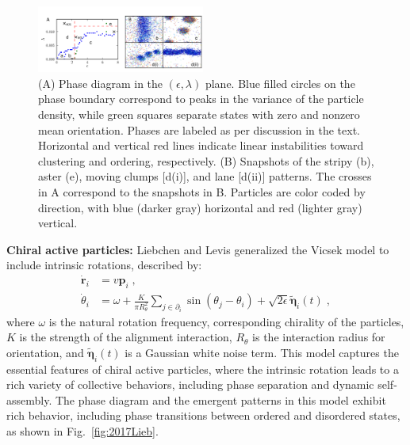 \documentclass[a4paper, amsfonts, amssymb, amsmath, reprint, showkeys, showpacs, nofootinbib, twoside]{revtex4-2}
\begin{document}
\begin{figure}
    \includegraphics[width=0.49\textwidth]{./figs/Farrell.png}
    \caption{
        \label{fig:ferrellSnapshots}
        (A) Phase diagram in the $(\epsilon, \lambda)$ plane. Blue filled circles on the phase boundary correspond to peaks in the variance of the particle density, while green squares separate states with zero and nonzero mean orientation. Phases are labeled as per discussion in the text. Horizontal and vertical red lines indicate linear instabilities toward clustering and ordering, respectively.
        (B) Snapshots of the stripy (b), aster (e), moving clumps [d(i)], and lane [d(ii)] patterns. The crosses in A correspond to the snapshots in B. Particles are color coded by direction, with blue (darker gray) horizontal and red (lighter gray) vertical.
    }
\end{figure}

\textbf{Chiral active particles:} Liebchen and Levis \cite{PhysRevLett.119.058002} generalized the Vicsek model to include intrinsic rotations, described by:
\begin{subequations}
    \label{eq:chiralActiveParticles}
    \begin{align}
        \dot{\mathbf{r}}_i&=v\mathbf{p}_i \;,
        \\
        \dot{\theta}_i&=\omega +\frac{K}{\pi R_{\theta}^{2}}\sum_{j\in \partial _i}{\sin \left( \theta _j-\theta _i \right)}+\sqrt{2\epsilon}\tilde{\boldsymbol{\eta}}_i\left( t \right) \;,
    \end{align}
\end{subequations}
where $\omega$ is the natural rotation frequency, corresponding chirality of the particles, $K$ is the strength of the alignment interaction, $R_{\theta}$ is the interaction radius for orientation, and $\tilde{\boldsymbol{\eta}}_i\left( t \right)$ is a Gaussian white noise term. This model captures the essential features of chiral active particles, where the intrinsic rotation leads to a rich variety of collective behaviors, including phase separation and dynamic self-assembly. The phase diagram and the emergent patterns in this model exhibit rich behavior, including phase transitions between ordered and disordered states, as shown in Fig.~\ref{fig:2017Lieb}.
    
\end{document}
